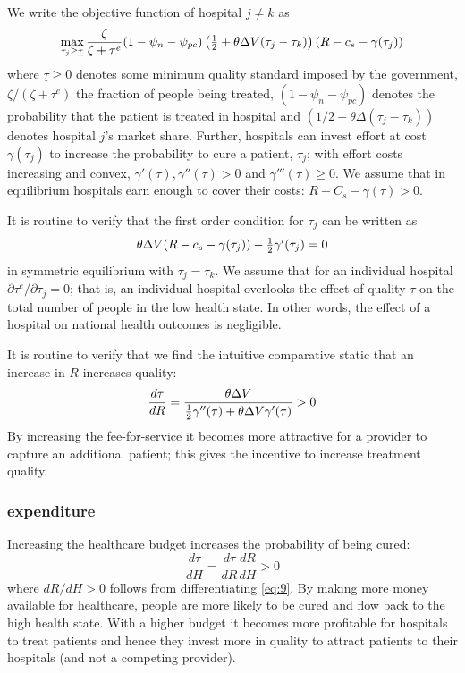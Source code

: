 \documentclass[a4paper,12pt]{article}
\begin{document}
We write the objective function of hospital \(j \neq k\) as
\begin{equation}
\label{eq:12}
\max_{\tau_j \geq \underline \tau} \frac{\zeta}{\zeta + \tau^e}(1-\psi_n-\psi_{pc})\left( \textstyle{1\over 2}  + \theta \Delta V (\tau_j - \tau_k) \right)(R-c_s - \gamma (\tau_j))
\end{equation}
where \(\underline \tau \geq 0\) denotes some minimum quality standard imposed by the government, \(\zeta/(\zeta+\tau^e)\) the fraction of people being treated, \((1-\psi_n - \psi_{pc})\) denotes the probability that the patient is treated in hospital and \((1/2 + \theta \Delta (\tau_j - \tau_k))\) denotes hospital \(j\)'s market share. Further, hospitals can invest effort at cost \(\gamma( \tau_j)\) to increase the probability to cure a patient, \(\tau_j\); with effort costs increasing and convex, \(\gamma'(\tau),\gamma''(\tau)>0\) and \(\gamma'''(\tau) \geq 0\). We assume that in equilibrium hospitals earn enough to cover their costs: \(R - C_s - \gamma(\tau) >0\).

It is routine to verify that the first order condition for \(\tau_j\) can be written as
\begin{equation}
\label{eq:13}
\theta \Delta V (R-c_s-\gamma(\tau_j))- \textstyle{1\over 2} \gamma'(\tau_{j})=0
\end{equation}
in symmetric equilibrium with \(\tau_j = \tau_k\). We assume that for an individual hospital \(\partial \tau^e/ \partial \tau_j =0\); that is, an individual hospital overlooks the effect of quality \(\tau\) on the total number of people in the low health state. In other words, the effect of a hospital on national health outcomes is negligible.

It is routine to verify that we find the intuitive comparative static that an increase in \(R\) increases quality:
\begin{equation}
\label{eq:20}
\frac{d\tau}{dR} = \frac{\theta \Delta V}{ \textstyle{1\over 2} \gamma''(\tau)+\theta \Delta V \gamma'(\tau) } > 0
\end{equation}
By increasing the fee-for-service  it becomes more attractive for a provider to capture an additional patient; this gives the incentive to increase treatment quality.


\subsubsection{expenditure}
\label{sec:org9d9f068}

Increasing the healthcare budget increases the probability of being cured:
\begin{equation}
\label{eq:16}
\frac{d\tau}{dH} = \frac{d\tau}{dR} \frac{dR}{dH} > 0
\end{equation}
where \(dR/dH > 0\) follows from differentiating \eqref{eq:9}. By making more money available for healthcare, people are more likely to be cured and flow back to the high health state. With a higher budget it becomes more profitable for hospitals to treat patients and hence they invest more in quality to attract patients to their hospitals (and not a competing provider).
\end{document}
